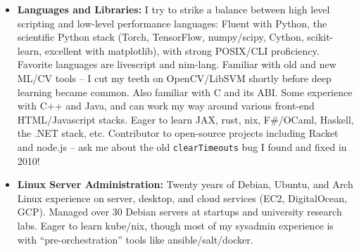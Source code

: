 \documentclass[10pt,letterpaper]{article}
\begin{document}
\begin{itemize}
\item \textbf{Languages and Libraries:}
  I try to strike a balance between high level scripting and low-level performance languages:
  Fluent with Python, the scientific Python stack (Torch, TensorFlow, numpy/scipy,
  Cython, scikit-learn, excellent with matplotlib),
  with strong POSIX/CLI proficiency. %
  Favorite languages are livescript and nim-lang.
  Familiar with old and new ML/CV tools -- I cut my teeth on OpenCV/LibSVM shortly before deep learning became common. Also familiar with C and its ABI.
  Some experience with C++ and Java, and can work my way around various front-end HTML/Javascript stacks.
  Eager to learn JAX, rust, nix, F\#/OCaml, Haskell, the .NET stack, etc.
  Contributor to open-source projects including Racket and node.js -- ask me about the old \verb+clearTimeouts+ bug I found and fixed in 2010!
\item \textbf{Linux Server Administration:}
  Twenty years of Debian, Ubuntu, and Arch Linux experience on server,
  desktop, and cloud services (EC2, Digital\-Ocean, GCP). Managed over 30
  Debian servers at startups and university research labs.
  Eager to learn kube/nix, though most of my sysadmin experience
  is with ``pre-orchestration'' tools like ansible/salt/docker.
\end{itemize}
\vspace{-5pt}
\end{document}
